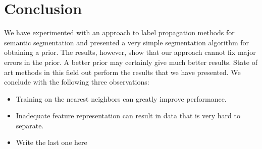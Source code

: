 \documentclass{article} %
\begin{document}
\section{Conclusion}
\label{sec:Conclusion}
We have experimented with an approach to label propagation methods for semantic segmentation and presented a very simple segmentation algorithm for obtaining a prior. The results, however, show that our approach cannot fix major errors in the prior. A better prior may certainly give much better results. State of art methods in this field out perform the results that we have presented. We conclude with the following three observations:
\begin{itemize}
\item Training on the nearest neighbors can greatly improve performance.
\item Inadequate feature representation can result in data that is very hard to separate.
\item Write the last one here
\end{itemize}



\end{document}
